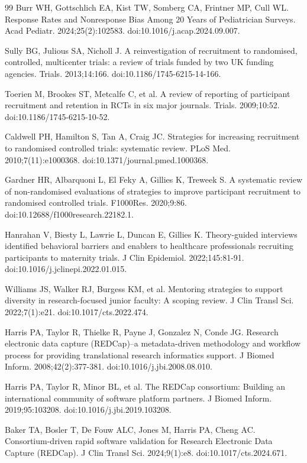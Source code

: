 \documentclass[11pt,a4paper]{article}
\begin{document}
\begin{thebibliography}{99}
 Burr WH, Gottschlich EA, Kist TW, Somberg CA, Frintner MP, Cull WL. Response Rates and Nonresponse Bias Among 20 Years of Pediatrician Surveys. Acad Pediatr. 2024;25(2):102583. doi:10.1016/j.acap.2024.09.007.

 Sully BG, Julious SA, Nicholl J. A reinvestigation of recruitment to randomised, controlled, multicenter trials: a review of trials funded by two UK funding agencies. Trials. 2013;14:166. doi:10.1186/1745-6215-14-166.

 Toerien M, Brookes ST, Metcalfe C, et al. A review of reporting of participant recruitment and retention in RCTs in six major journals. Trials. 2009;10:52. doi:10.1186/1745-6215-10-52.

 Caldwell PH, Hamilton S, Tan A, Craig JC. Strategies for increasing recruitment to randomised controlled trials: systematic review. PLoS Med. 2010;7(11):e1000368. doi:10.1371/journal.pmed.1000368.

 Gardner HR, Albarquoni L, El Feky A, Gillies K, Treweek S. A systematic review of non-randomised evaluations of strategies to improve participant recruitment to randomised controlled trials. F1000Res. 2020;9:86. doi:10.12688/f1000research.22182.1.

 Hanrahan V, Biesty L, Lawrie L, Duncan E, Gillies K. Theory-guided interviews identified behavioral barriers and enablers to healthcare professionals recruiting participants to maternity trials. J Clin Epidemiol. 2022;145:81-91. doi:10.1016/j.jclinepi.2022.01.015.

 Williams JS, Walker RJ, Burgess KM, et al. Mentoring strategies to support diversity in research-focused junior faculty: A scoping review. J Clin Transl Sci. 2022;7(1):e21. doi:10.1017/cts.2022.474.

 Harris PA, Taylor R, Thielke R, Payne J, Gonzalez N, Conde JG. Research electronic data capture (REDCap)--a metadata-driven methodology and workflow process for providing translational research informatics support. J Biomed Inform. 2008;42(2):377-381. doi:10.1016/j.jbi.2008.08.010.

 Harris PA, Taylor R, Minor BL, et al. The REDCap consortium: Building an international community of software platform partners. J Biomed Inform. 2019;95:103208. doi:10.1016/j.jbi.2019.103208.

 Baker TA, Bosler T, De Fouw ALC, Jones M, Harris PA, Cheng AC. Consortium-driven rapid software validation for Research Electronic Data Capture (REDCap). J Clin Transl Sci. 2024;9(1):e8. doi:10.1017/cts.2024.671.


\end{thebibliography}
\end{document}
